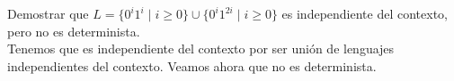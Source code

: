 \begin{ejercicio}\label{ej:1.6.19}
    Demostrar que $L=\{0^i 1^i \mid i\geq 0\} \cup \{0^i1^{2i} \mid i\geq 0\}$ es independiente del contexto, pero no es determinista.\\

    Tenemos que es independiente del contexto por ser unión de lenguajes independientes del contexto. Veamos ahora que no es determinista.
    
    

    \begin{comment}
    Para ello, consideramos como lenguaje auxiliar el lenguaje regular $L_1$ con expresión regular $0^*1^*$.

    Por reducción al absurdo, supongamos que $L$ es determinista. Entonces, como los lenguajes independientes del contexto \emph{deterministas} son cerrados por complementarios, tenemos que $\ol{L}$ es independiente del contexto (determinista). Como la intersección de un lenguaje independiente del contexto y un lenguaje regular es independiente del contexto, tenemos que $\ol{L}\cap L_1$ es independiente del contexto:
    \begin{equation*}
        \ol{L}\cap L_1 = \{0^i1^j \mid i\neq j ~\land~ 2i\neq j\}
    \end{equation*}
    Por ser $\ol{L}\cap L_1$ independiente del contexto, cumple el Lema de Bombeo. Sea $n$ la constante que nos da este Lema, y sea $z=0^n1^{2n}$. Por el Lema de Bombeo, podemos escribir $z=uvwxy$ con $|vwx|\leq n$, $|vx|\geq 1$ y $uv^iwx^iy\in \ol{L}\cap L_1$ para todo $i\geq 0$. Consideramos ahora $i=2$. Entonces, $uv^2wx^2y=0^{n+|vx|}1^{2n+|vx|}\in \ol{L}\cap L_1$, lo cual es una contradicción. Por tanto, $L$ no es determinista.
    \end{comment}



\end{ejercicio}

